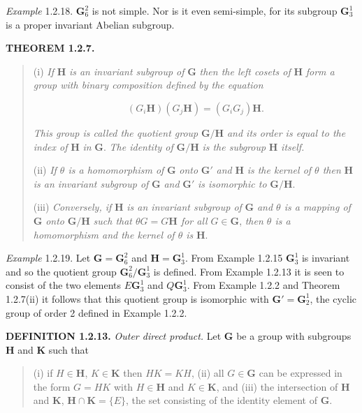 \documentclass[11pt,a4paper,twoside,openright]{book}
\begin{document}
\textit{Example} 1.2.18. $\mathbf{G}_6^2$ is not simple. Nor is it even semi-simple, for its subgroup $\mathbf{G}_3^1$ is a proper invariant Abelian subgroup.

\textbf{THEOREM 1.2.7.}

\begin{quote}(i) \textit{If} $\mathbf{H}$ \textit{is an invariant subgroup of} $\mathbf{G}$ \textit{then the left cosets of} $\mathbf{H}$ \textit{form a group with binary composition defined by the equation}

\begin{equation*}
(G_{i}\mathbf{H})(G_{j}\mathbf{H}) = (G_{i}G_{j})\mathbf{H}. \tag{1.2.4}
\end{equation*}

\textit{This group is called the quotient group} $\mathbf{G}/\mathbf{H}$ \textit{and its order is equal to the index of} $\mathbf{H}$ \textit{in} $\mathbf{G}$. \textit{The identity of} $\mathbf{G}/\mathbf{H}$ \textit{is the subgroup} $\mathbf{H}$ \textit{itself.}

(ii) \textit{If $\theta$ is a homomorphism of} $\mathbf{G}$ \textit{onto} $\mathbf{G}'$ \textit{and} $\mathbf{H}$ \textit{is the kernel of $\theta$ then} $\mathbf{H}$ \textit{is an invariant subgroup of} $\mathbf{G}$ \textit{and} $\mathbf{G}'$ \textit{is isomorphic to} $\mathbf{G}/\mathbf{H}$.

(iii) \textit{Conversely, if} $\mathbf{H}$ \textit{is an invariant subgroup of} $\mathbf{G}$ \textit{and $\theta$ is a mapping of} $\mathbf{G}$ \textit{onto} $\mathbf{G}/\mathbf{H}$ \textit{such that $\theta G = G\mathbf{H}$ for all} $G \in \mathbf{G}$, \textit{then $\theta$ is a homomorphism and the kernel of $\theta$ is} $\mathbf{H}$.\end{quote}

\textit{Example} 1.2.19. Let $\mathbf{G} = \mathbf{G}_6^2$ and $\mathbf{H} = \mathbf{G}_3^1$. From Example 1.2.15 $\mathbf{G}_3^1$ is invariant and so the quotient group $\mathbf{G}_6^2/\mathbf{G}_3^1$ is defined. From Example 1.2.13 it is seen to consist of the two elements $E\mathbf{G}_3^1$ and $Q\mathbf{G}_3^1$. From Example 1.2.2 and Theorem 1.2.7(ii) it follows that this quotient group is isomorphic with $\mathbf{G}' = \mathbf{G}_2^1$, the cyclic group of order 2 defined in Example 1.2.2.

\textbf{DEFINITION 1.2.13.} \textit{Outer direct product.} Let $\mathbf{G}$ be a group with subgroups $\mathbf{H}$ and $\mathbf{K}$ such that

\begin{quote}(i) if $H \in \mathbf{H}$, $K \in \mathbf{K}$ then $HK = KH$, (ii) all $G \in \mathbf{G}$ can be expressed in the form $G = HK$ with $H \in \mathbf{H}$ and $K \in \mathbf{K}$, and (iii) the intersection of $\mathbf{H}$ and $\mathbf{K}$, $\mathbf{H} \cap \mathbf{K} = \{E\}$, the set consisting of the identity element of $\mathbf{G}$.\end{quote}
\end{document}

